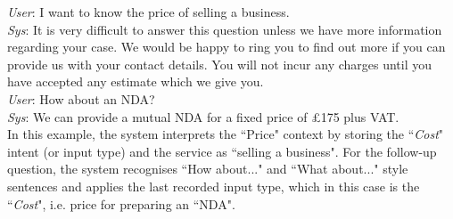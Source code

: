 \documentclass[runningheads]{llncs}
\begin{document}
\noindent
\textit{User}: I want to know the price of selling a business.\\
\textit{Sys}: It is very difficult to answer this question unless we have more information regarding your case. We would be happy to ring you to find out more if you can provide us with your contact details. You will not incur any charges until you have accepted any estimate which we give you.\\
\textit{User}: How about an NDA?\\
\textit{Sys}: We can provide a mutual NDA for a fixed price of £175 plus VAT.\\

In this example, the system interprets the ``Price" context by storing the ``\textit{Cost}" intent (or input type) and the service as ``selling a business". For the follow-up question, the system recognises ``How about..." and ``What about..." style sentences and applies the last recorded input type, which in this case is the ``\textit{Cost}", i.e. price for preparing an ``NDA". 


\end{document}
